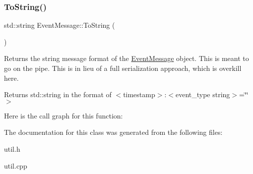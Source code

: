 \subsubsection{\texorpdfstring{To\+String()}{ToString()}}
{\footnotesize\ttfamily std\+::string Event\+Message\+::\+To\+String (\begin{DoxyParamCaption}{ }\end{DoxyParamCaption})}



Returns the string message format of the \mbox{\hyperlink{classEventMessage}{Event\+Message}} object. This is meant to go on the pipe. This is in lieu of a full serialization approach, which is overkill here. 

\begin{DoxyReturn}{Returns}
std\+::string in the format of $<$timestamp$>$\+:$<$event\+\_\+type string$>$=\char`\"{}\char`\"{}$>$ 
\end{DoxyReturn}
Here is the call graph for this function\+:


The documentation for this class was generated from the following files\+:\begin{DoxyCompactItemize}
\item 
util.\+h\item 
util.\+cpp\end{DoxyCompactItemize}
